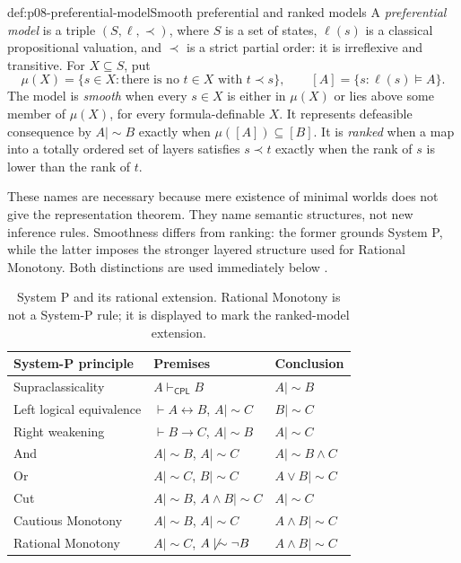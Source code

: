 \begin{hbdefinition}{def:p08-preferential-model}{Smooth preferential and ranked models}
A \emph{preferential model} is a triple \((S,\ell,\prec)\), where \(S\) is a
set of states, \(\ell(s)\) is a classical propositional valuation, and
\(\prec\) is a strict partial order: it is irreflexive and transitive.  For
\(X\subseteq S\), put
\[
 \mu(X)=\{s\in X:\text{there is no }t\in X\text{ with }t\prec s\},
 \qquad
 [A]=\{s:\ell(s)\models A\}.
\]
The model is \emph{smooth} when every \(s\in X\) is either in \(\mu(X)\) or
lies above some member of \(\mu(X)\), for every formula-definable \(X\).
It represents defeasible consequence by
\(A\mathrel{|\!\sim}B\) exactly when
\(\mu([A])\subseteq[B]\).  It is \emph{ranked} when a map into a totally
ordered set of layers satisfies
\(s\prec t\) exactly when the rank of \(s\) is lower than the rank of \(t\).

These names are necessary because mere existence of minimal worlds does not
give the representation theorem.  They name semantic structures, not new
inference rules.  Smoothness differs from ranking: the former grounds System
P, while the latter imposes the stronger layered structure used for Rational
Monotony.  Both distinctions are used immediately below
\cite{KrausLehmannMagidor1990,LehmannMagidor1992}.
\end{hbdefinition}

\begin{table}[htbp]
\centering\small
\begin{tabularx}{\textwidth}{@{}l X X@{}}
\toprule
System-P principle & Premises & Conclusion \\
\midrule
Supraclassicality & \(A\vdash_{\mathsf{CPL}}B\) &
  \(A\mathrel{|\!\sim}B\) \\
Left logical equivalence & \(\vdash A\leftrightarrow B\),
  \(A\mathrel{|\!\sim}C\) & \(B\mathrel{|\!\sim}C\) \\
Right weakening & \(\vdash B\to C\), \(A\mathrel{|\!\sim}B\) &
  \(A\mathrel{|\!\sim}C\) \\
And & \(A\mathrel{|\!\sim}B\), \(A\mathrel{|\!\sim}C\) &
  \(A\mathrel{|\!\sim}B\land C\) \\
Or & \(A\mathrel{|\!\sim}C\), \(B\mathrel{|\!\sim}C\) &
  \(A\lor B\mathrel{|\!\sim}C\) \\
Cut & \(A\mathrel{|\!\sim}B\), \(A\land B\mathrel{|\!\sim}C\) &
  \(A\mathrel{|\!\sim}C\) \\
Cautious Monotony & \(A\mathrel{|\!\sim}B\),
  \(A\mathrel{|\!\sim}C\) & \(A\land B\mathrel{|\!\sim}C\) \\
Rational Monotony & \(A\mathrel{|\!\sim}C\),
  \(A\not\mathrel{|\!\sim}\neg B\) &
  \(A\land B\mathrel{|\!\sim}C\) \\
\bottomrule
\end{tabularx}
\caption{System P and its rational extension.  Rational Monotony is not a
System-P rule; it is displayed to mark the ranked-model extension.}
\label{tab:p08-system-p-rules}
\end{table}

